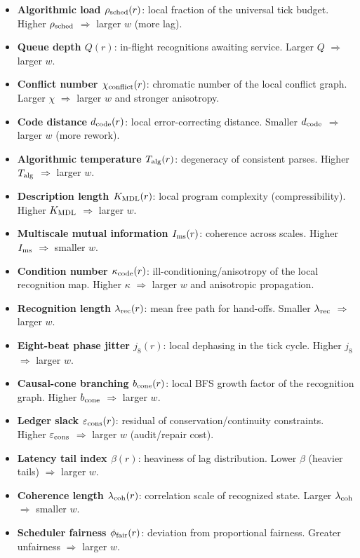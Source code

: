 \documentclass[fleqn,usenatbib]{mnras}
\begin{document}
\begin{itemize}
  \item \textbf{Algorithmic load $\rho_{\rm sched}(r)$}: local fraction of the universal tick budget. Higher $\rho_{\rm sched}$ $\Rightarrow$ larger $w$ (more lag).
  \item \textbf{Queue depth $Q(r)$}: in-flight recognitions awaiting service. Larger $Q$ $\Rightarrow$ larger $w$.
  \item \textbf{Conflict number $\chi_{\rm conflict}(r)$}: chromatic number of the local conflict graph. Larger $\chi$ $\Rightarrow$ larger $w$ and stronger anisotropy.
  \item \textbf{Code distance $d_{\rm code}(r)$}: local error-correcting distance. Smaller $d_{\rm code}$ $\Rightarrow$ larger $w$ (more rework).
  \item \textbf{Algorithmic temperature $T_{\rm alg}(r)$}: degeneracy of consistent parses. Higher $T_{\rm alg}$ $\Rightarrow$ larger $w$.
  \item \textbf{Description length $K_{\rm MDL}(r)$}: local program complexity (compressibility). Higher $K_{\rm MDL}$ $\Rightarrow$ larger $w$.
  \item \textbf{Multiscale mutual information $I_{\rm ms}(r)$}: coherence across scales. Higher $I_{\rm ms}$ $\Rightarrow$ smaller $w$.
  \item \textbf{Condition number $\kappa_{\rm code}(r)$}: ill-conditioning/anisotropy of the local recognition map. Higher $\kappa$ $\Rightarrow$ larger $w$ and anisotropic propagation.
  \item \textbf{Recognition length $\lambda_{\rm rec}(r)$}: mean free path for hand-offs. Smaller $\lambda_{\rm rec}$ $\Rightarrow$ larger $w$.
  \item \textbf{Eight-beat phase jitter $j_8(r)$}: local dephasing in the tick cycle. Higher $j_8$ $\Rightarrow$ larger $w$.
  \item \textbf{Causal-cone branching $b_{\rm cone}(r)$}: local BFS growth factor of the recognition graph. Higher $b_{\rm cone}$ $\Rightarrow$ larger $w$.
  \item \textbf{Ledger slack $\varepsilon_{\rm cons}(r)$}: residual of conservation/continuity constraints. Higher $\varepsilon_{\rm cons}$ $\Rightarrow$ larger $w$ (audit/repair cost).
  \item \textbf{Latency tail index $\beta(r)$}: heaviness of lag distribution. Lower $\beta$ (heavier tails) $\Rightarrow$ larger $w$.
  \item \textbf{Coherence length $\lambda_{\rm coh}(r)$}: correlation scale of recognized state. Larger $\lambda_{\rm coh}$ $\Rightarrow$ smaller $w$.
  \item \textbf{Scheduler fairness $\phi_{\rm fair}(r)$}: deviation from proportional fairness. Greater unfairness $\Rightarrow$ larger $w$.
\end{itemize}
\end{document}
